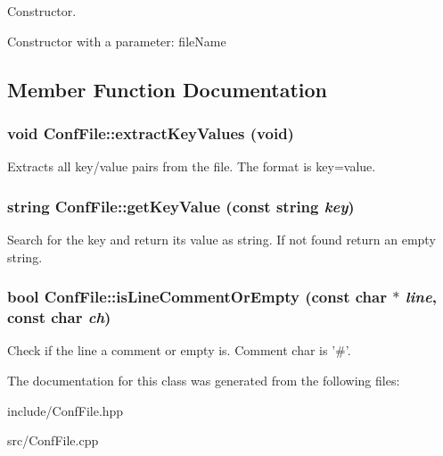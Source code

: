 Constructor. 

Constructor with a parameter: file\-Name 

\subsection{Member Function Documentation}
\subsubsection{\setlength{\rightskip}{0pt plus 5cm}void Conf\-File::extract\-Key\-Values (void)\hspace{0.3cm}{\tt  [private]}}\label{classConfFile_d1}


Extracts all key/value pairs from the file. The format is key=value. 
\subsubsection{\setlength{\rightskip}{0pt plus 5cm}string Conf\-File::get\-Key\-Value (const string {\em key})\hspace{0.3cm}{\tt  [private]}}\label{classConfFile_d2}


Search for the key and return its value as string. If not found return an empty string. 
\subsubsection{\setlength{\rightskip}{0pt plus 5cm}bool Conf\-File::is\-Line\-Comment\-Or\-Empty (const char $\ast$ {\em line}, const char {\em ch})\hspace{0.3cm}{\tt  [private]}}\label{classConfFile_d3}


Check if the line a comment or empty is. Comment char is '\#'. 

The documentation for this class was generated from the following files:\begin{CompactItemize}
\item 
include/Conf\-File.hpp\item 
src/Conf\-File.cpp\end{CompactItemize}
